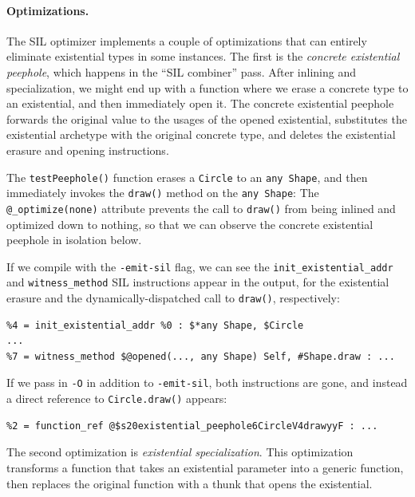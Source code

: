 \documentclass[../generics]{subfiles}
\begin{document}
\paragraph{Optimizations.}
The SIL optimizer implements a couple of optimizations that can entirely eliminate existential types in some instances. The first is the \emph{concrete existential peephole}, which happens in the ``SIL combiner'' pass. After inlining and specialization, we might end up with a function where we erase a concrete type to an existential, and then immediately open it. The concrete existential peephole forwards the original value to the usages of the opened existential, substitutes the existential archetype with the original concrete type, and deletes the existential erasure and opening instructions.

\begin{example}
The \texttt{testPeephole()} function erases a \texttt{Circle} to an \texttt{any~Shape}, and then immediately invokes the \texttt{draw()} method on the \texttt{any~Shape}:
The \verb|@_optimize(none)| attribute prevents the call to \texttt{draw()} from being inlined and optimized down to nothing, so that we can observe the concrete existential peephole in isolation below.

If we compile with the \texttt{-emit-sil} flag, we can see the \verb|init_existential_addr| and \verb|witness_method| SIL instructions appear in the output, for the existential erasure and the dynamically-dispatched call to \texttt{draw()}, respectively:
\begin{Verbatim}
%4 = init_existential_addr %0 : $*any Shape, $Circle
...
%7 = witness_method $@opened(..., any Shape) Self, #Shape.draw : ...
\end{Verbatim}
If we pass in \texttt{-O} in addition to \texttt{-emit-sil}, both instructions are gone, and instead a direct reference to \texttt{Circle.draw()} appears:
\begin{Verbatim}
%2 = function_ref @$s20existential_peephole6CircleV4drawyyF : ...
\end{Verbatim}
\end{example}

The second optimization is \emph{existential specialization}. This optimization transforms a function that takes an existential parameter into a generic function, then replaces the original function with a thunk that opens the existential.
\end{document}
